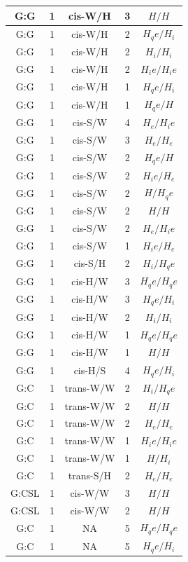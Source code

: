 \begin{center}
\begin{longtable}{c|c|c|c|c}
G:G & 1 & cis-W/H & 3 & $H/H$ \\  \hline
G:G & 1 & cis-W/H & 2 & $H_qe/H_i$ \\  \hline
G:G & 1 & cis-W/H & 2 & $H_i/H_i$ \\  \hline
G:G & 1 & cis-W/H & 2 & $H_ie/H_ie$ \\  \hline
G:G & 1 & cis-W/H & 1 & $H_qe/H_i$ \\  \hline
G:G & 1 & cis-W/H & 1 & $H_qe/H$ \\  \hline
G:G & 1 & cis-S/W & 4 & $H_e/H_ie$ \\  \hline
G:G & 1 & cis-S/W & 3 & $H_e/H_e$ \\  \hline
G:G & 1 & cis-S/W & 2 & $H_qe/H$ \\  \hline
G:G & 1 & cis-S/W & 2 & $H_ie/H_e$ \\  \hline
G:G & 1 & cis-S/W & 2 & $H/H_qe$ \\  \hline
G:G & 1 & cis-S/W & 2 & $H/H$ \\  \hline
G:G & 1 & cis-S/W & 2 & $H_e/H_ie$ \\  \hline
G:G & 1 & cis-S/W & 1 & $H_ie/H_e$ \\  \hline
G:G & 1 & cis-S/H & 2 & $H_i/H_qe$ \\  \hline
G:G & 1 & cis-H/W & 3 & $H_qe/H_qe$ \\  \hline
G:G & 1 & cis-H/W & 3 & $H_qe/H_i$ \\  \hline
G:G & 1 & cis-H/W & 2 & $H_i/H_i$ \\  \hline
G:G & 1 & cis-H/W & 1 & $H_qe/H_qe$ \\  \hline
G:G & 1 & cis-H/W & 1 & $H/H$ \\  \hline
G:G & 1 & cis-H/S & 4 & $H_qe/H_i$ \\  \hline
G:C & 1 & trans-W/W & 2 & $H_i/H_qe$ \\  \hline
G:C & 1 & trans-W/W & 2 & $H/H$ \\  \hline
G:C & 1 & trans-W/W & 2 & $H_e/H_e$ \\  \hline
G:C & 1 & trans-W/W & 1 & $H_ie/H_ie$ \\  \hline
G:C & 1 & trans-W/W & 1 & $H/H_i$ \\  \hline
G:C & 1 & trans-S/H & 2 & $H_e/H_e$ \\  \hline
G:CSL & 1 & cis-W/W & 3 & $H/H$ \\  \hline
G:CSL & 1 & cis-W/W & 2 & $H/H$ \\  \hline
G:C & 1 & NA & 5 & $H_qe/H_qe$ \\  \hline
G:C & 1 & NA & 5 & $H_qe/H_i$ \\  \hline

\end{longtable}
\end{center}
